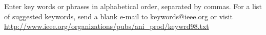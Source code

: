 \documentclass{ieeeaccess}
\begin{document}
\begin{keywords}
Enter key words or phrases in alphabetical 
order, separated by commas. For a list of suggested keywords, send a blank 
e-mail to keywords@ieee.org or visit \underline
{http://www.ieee.org/organizations/pubs/ani\_prod/keywrd98.txt}
\end{keywords}

\titlepgskip=-15pt

\maketitle




%





\end{document}
